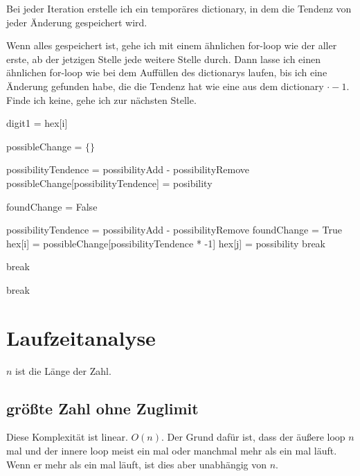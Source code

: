 \documentclass[a4paper,10pt,ngerman]{scrartcl}
\begin{document}
Bei jeder Iteration erstelle ich ein temporäres dictionary, in dem die Tendenz von jeder Änderung gespeichert wird. 

Wenn alles gespeichert ist, gehe ich mit einem ähnlichen for-loop wie der aller erste, ab der jetzigen Stelle jede weitere Stelle durch. Dann lasse ich einen ähnlichen for-loop wie bei dem Auffüllen des dictionarys laufen, bis ich eine Änderung gefunden habe, die die Tendenz hat wie eine aus dem dictionary $\cdot -1$. Finde ich keine, gehe ich zur nächsten Stelle.

\begin{algorithmic}[1]
\State digit1 = hex[i]

\State possibleChange = $\{\}$

\State possibilityTendence = possibilityAdd - possibilityRemove
\State possibleChange[possibilityTendence] = posibility
\EndIf 
{}
\EndFor


\State foundChange = False

\State possibilityTendence = possibilityAdd - possibilityRemove
\State foundChange = True
\State hex[i] = possibleChange[possibilityTendence * -1]
\State hex[j] = possibility
\State break
\EndIf
\EndFor

\State break
\EndIf
\EndFor

\State break
\EndIf
\EndFor

\end{algorithmic}



\section{Laufzeitanalyse}

$n$ ist die Länge der Zahl.

\subsection{größte Zahl ohne Zuglimit}

Diese Komplexität ist linear. $O(n)$. Der Grund dafür ist, dass der äußere loop $n$ mal und der innere loop meist ein mal oder manchmal mehr als ein mal läuft. Wenn er mehr als  ein mal läuft, ist dies aber unabhängig von $n$.
\end{document}
